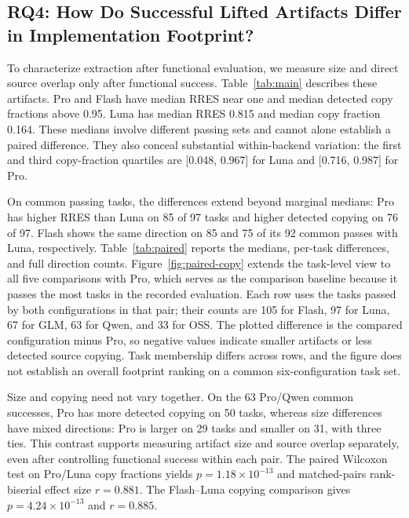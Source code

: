 \documentclass[acmsmall,screen,review,anonymous,nonacm]{acmart}
\begin{document}
\subsection{RQ4: How Do Successful Lifted Artifacts Differ in Implementation Footprint?}
\label{sec:rq4}

To characterize extraction after functional evaluation, we measure size and
direct source overlap only after
functional success. Table~\ref{tab:main} describes these artifacts. Pro and Flash have
median RRES near one and median detected copy fractions above 0.95. Luna has
median RRES 0.815 and median copy fraction 0.164. These medians involve different
passing sets and cannot alone establish a paired difference. They also conceal
substantial within-backend variation: the first and third copy-fraction
quartiles are [0.048, 0.967] for Luna and [0.716, 0.987] for Pro.


On common passing tasks, the differences extend beyond marginal medians:
Pro has higher RRES than Luna on 85 of 97 tasks and higher detected copying
on 76 of 97. Flash shows the same direction on 85 and 75 of its 92 common
passes with Luna, respectively. Table~\ref{tab:paired} reports the medians,
per-task differences, and full direction counts. Figure~\ref{fig:paired-copy}
extends the task-level view to all five comparisons with Pro, which serves as
the comparison baseline because it passes the most tasks in the recorded evaluation.
Each row uses the tasks passed by both configurations in that pair; their
counts are 105 for Flash, 97 for Luna, 67 for GLM, 63 for Qwen, and 33 for OSS.
The plotted difference is the compared configuration minus Pro, so negative
values indicate smaller artifacts or less detected source copying. Task
membership differs across rows, and the figure does not establish an overall
footprint ranking on a common six-configuration task set.

Size and copying need not vary together. On the 63 Pro/Qwen common successes,
Pro has more detected copying on 50 tasks, whereas size differences have mixed
directions: Pro is larger on 29 tasks and smaller on 31, with three ties.
This contrast supports measuring artifact size and source overlap separately,
even after controlling functional success within each pair.
The paired Wilcoxon test on Pro/Luna copy fractions yields
$p=1.18\times10^{-13}$ and matched-pairs rank-biserial effect size $r=0.881$.
The Flash--Luna copying comparison gives $p=4.24\times10^{-13}$ and $r=0.885$.
\end{document}
